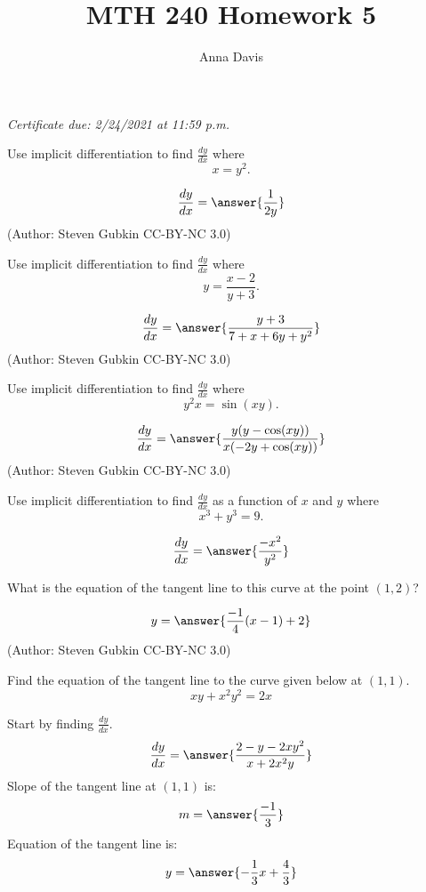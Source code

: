 \documentclass{ximera}
\author{Anna Davis} \title{MTH 240 Homework 5}
\begin{document}
\begin{abstract}

\end{abstract}
\maketitle
 \textit{Certificate due: 2/24/2021 at 11:59 p.m.}
 
 \begin{problem}\label{prob:240hom5prob5}
 Use implicit differentiation to find $\frac{dy}{dx}$ where
\[
x = y^2.
\]

\[
\frac{dy}{dx} = \answer{\frac{1}{2y}}
\]
(Author: Steven Gubkin CC-BY-NC 3.0)
 \end{problem}
 
 
 \begin{problem}\label{prob:240hom5prob4}
 Use implicit differentiation to find $\frac{dy}{dx}$ where
\[
y = \frac{x-2}{y+3}.
\]

\[
\frac{dy}{dx} = \answer{\frac{y+3}{7+x+6y+y^2}}
\]
(Author: Steven Gubkin CC-BY-NC 3.0)
 \end{problem}
 
  \begin{problem}\label{prob:240hom5prob3}
Use implicit differentiation to find $\frac{dy}{dx}$ where
\[
y^2x = \sin(xy).
\]

\[
\frac{dy}{dx} = \answer{\frac{y(y-\cos(xy))}{x(-2y+\cos(xy))}}
\]
(Author: Steven Gubkin CC-BY-NC 3.0)
 \end{problem}
 
 
 \begin{problem}\label{prob:240hom5prob6}
 Use implicit differentiation to find $\frac{dy}{dx}$ as a function of $x$ and $y$ where
\[
x^3+y^3 = 9.
\]

\[
\frac{dy}{dx} = \answer{\frac{-x^2}{y^2}}
\]

What is the equation of the tangent line to this curve at the point $(1,2)$?

\[
y = \answer{\frac{-1}{4}(x-1)+2}
\]
(Author: Steven Gubkin CC-BY-NC 3.0)
 \end{problem} 
 
 \begin{problem}\label{prob:240hom5prob1}
Find the equation of the tangent line to the curve given below at $(1,1)$.
$$xy+x^2y^2=2x$$

Start by finding $\frac{dy}{dx}$.
$$\frac{dy}{dx}=\answer{\frac{2-y-2xy^2}{x+2x^2y}}$$
Slope of the tangent line at $(1,1)$ is:
$$m=\answer{\frac{-1}{3}}$$
Equation of the tangent line is:
$$y=\answer{-\frac{1}{3}x+\frac{4}{3}}$$
 \end{problem}
 
\end{document}
